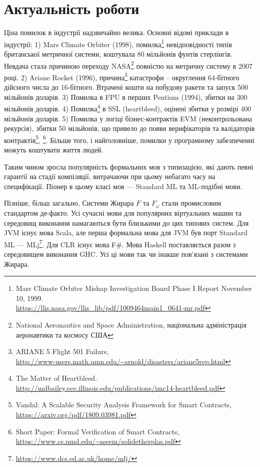 \section{Актуальність роботи}
Ціна помилок в індустрії надзвичайно велика. Основні відомі приклади в індустрії:
1) Mars Climate Orbiter (1998),
   помилка\footnote{Mars Climate Orbiter Mishap Investigation Board Phase I Report November 10, 1999. \\
                    \url{https://llis.nasa.gov/llis_lib/pdf/1009464main1_0641-mr.pdf}}
   невідповідності типів британської метричної системи, коштувала 80 мільйонів фунтів стерлінгів.
   Невдача стала причиною переходу
   NASA\footnote{National Aeronautics and Space Administration, національна адміністрація аеронавтики та космосу США}
   повністю на метричну систему в 2007 році.
2) Ariane Rocket (1996),
   причина\footnote{ARIANE 5 Flight 501 Failure, \\
          \url{http://www-users.math.umn.edu/~arnold/disasters/ariane5rep.html}}
   катастрофи -- округлення 64-бітного дійсного числа до 16-бітного.
   Втрачені кошти на побудову ракети та запуск 500 мільйонів доларів.
3) Помилка в FPU в перших Pentium (1994), збитки на 300 мільйонів доларів.
4) Помилка\footnote{The Matter of Heartbleed. \\
                    \url{http://mdbailey.ece.illinois.edu/publications/imc14-heartbleed.pdf}}
   в SSL (heartbleed), оцінені збитки у розмірі 400 мільйонів доларів.
5) Помилка у логіці бізнес-контрактів EVM (неконтрольована рекурсія), збитки 50 мільйонів,
   що привело до появи верифікаторів та валідаторів
   контрактів\footnote{Vandal: A Scalable Security Analysis Framework for Smart Contracts, \\
                       \url{https://arxiv.org/pdf/1809.03981.pdf}},
             \footnote{Short Paper: Formal Verification of Smart Contracts, \\
                       \url{https://www.cs.umd.edu/~aseem/solidetherplas.pdf}}.
Більше того, і найголовніше, помилки у програмному забезпеченні можуть коштувати життя людей.

Таким чином зросла популярність формальних мов з типизацією, які дають певні гарантії
на стадії компіляції, витрачаючи при цьому небагато часу на специфікації. Піонер в цьому класі
мов --- Standard ML та ML-подібні мови.

Пізніше, більш загально, Системи Жирара $F$ та $F_\omega$ стали промисловим стандартом де-факто.
Усі сучасні мови для популярних віртуальних машин та середовищ виконання намагаються бути
близькими до цих типових систем. Для JVM існує мова Scala, але перша формальна мова для
JVM був порт Standard ML --- MLj\footnote{\url{https://www.dcs.ed.ac.uk/home/mlj/}}.
Для CLR існує мова F\#. Мова Haskell поставляється разом
з середовищем виконання GHC. Усі ці мови так чи інакше пов'язані з системами Жирара.


